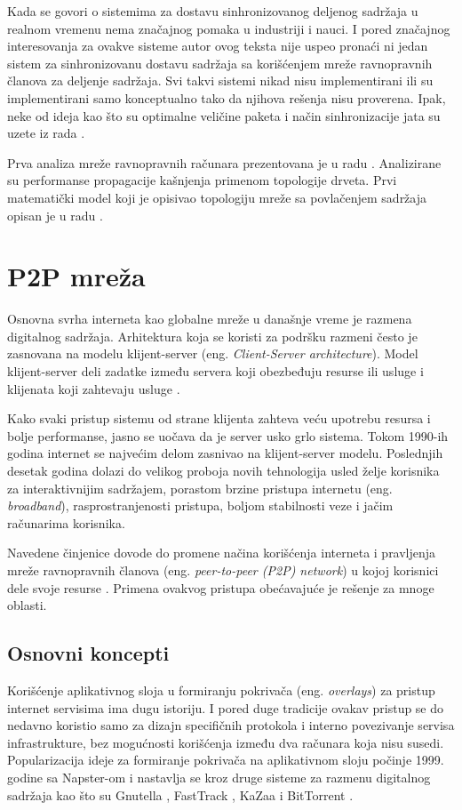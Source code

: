 \documentclass[12pt,oneside]{memoir}
\begin{document}
Kada se govori o sistemima za dostavu sinhronizovanog deljenog sadržaja u realnom vremenu nema značajnog pomaka u industriji i nauci. I pored značajnog interesovanja za ovakve sisteme autor ovog teksta nije uspeo pronaći ni jedan sistem za sinhronizovanu dostavu sadržaja sa korišćenjem mreže ravnopravnih članova za deljenje sadržaja. Svi takvi sistemi nikad nisu implementirani ili su implementirani samo konceptualno tako da njihova rešenja nisu proverena. Ipak, neke od ideja kao što su optimalne veličine paketa i način sinhronizacije jata su uzete iz rada \cite{Zhang4698112}.

Prva analiza mreže ravnopravnih računara prezentovana je u radu \cite{Small}. Analizirane su performanse propagacije kašnjenja primenom topologije drveta. Prvi matematički model koji je opisivao topologiju mreže sa povlačenjem sadržaja opisan je u radu \cite{EURECOM+2326}.

\chapter{P2P mreža}
\label{chp:p2p-uvod}

Osnovna svrha interneta kao globalne mreže u današnje vreme je razmena digitalnog sadržaja. Arhitektura koja se koristi za podršku razmeni često je zasnovana na modelu klijent-server (eng. \textit{Client-Server architecture}). Model klijent-server deli zadatke između servera koji obezbeđuju resurse ili usluge i klijenata koji zahtevaju usluge \cite{DeBoever07}.

Kako svaki pristup sistemu od strane klijenta zahteva veću upotrebu resursa i bolje performanse, jasno se uočava da je server usko grlo sistema. 
Tokom 1990-ih godina internet se najvećim delom zasnivao na klijent-server modelu. Poslednjih desetak godina dolazi do velikog proboja novih tehnologija usled želje korisnika za interaktivnijim sadržajem, porastom brzine pristupa internetu (eng. \textit{broadband}), rasprostranjenosti pristupa, boljom stabilnosti veze i jačim računarima korisnika.

Navedene činjenice dovode do promene načina korišćenja interneta i pravljenja mreže ravnopravnih članova (eng. \textit{peer-to-peer (P2P) network}) u kojoj korisnici dele svoje resurse \cite{Tanenbaum}. Primena ovakvog pristupa obećavajuće je rešenje za mnoge oblasti.

\section{Osnovni koncepti}
\label{P2P.1}
Korišćenje aplikativnog sloja u formiranju pokrivača (eng. \textit{overlays}) za pristup internet servisima ima dugu istoriju. I pored duge tradicije ovakav pristup se do nedavno koristio samo za dizajn specifičnih protokola i interno povezivanje servisa infrastrukture, bez mogućnosti korišćenja između dva računara koja nisu susedi. Popularizacija ideje za formiranje pokrivača na aplikativnom sloju počinje 1999. godine sa Napster-om \cite{Aberer_2004} i nastavlja se kroz druge sisteme za razmenu digitalnog sadržaja kao što su Gnutella \cite{Gnutella}, FastTrack \cite{FastTrack}, KaZaa \cite{kazaa} i BitTorrent \cite{Bittorent}. 
\end{document}
